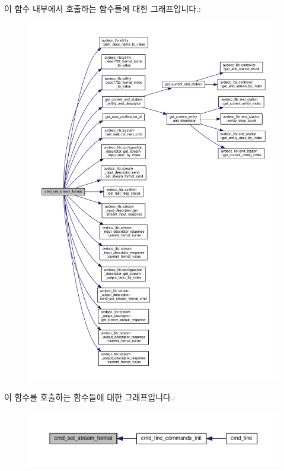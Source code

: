이 함수 내부에서 호출하는 함수들에 대한 그래프입니다.\+:
\nopagebreak
\begin{figure}[H]
\begin{center}
\leavevmode
\includegraphics[width=350pt]{classcmd__line_ac12fbbb5159e345869b53aeade846957_cgraph}
\end{center}
\end{figure}




이 함수를 호출하는 함수들에 대한 그래프입니다.\+:
\nopagebreak
\begin{figure}[H]
\begin{center}
\leavevmode
\includegraphics[width=350pt]{classcmd__line_ac12fbbb5159e345869b53aeade846957_icgraph}
\end{center}
\end{figure}


